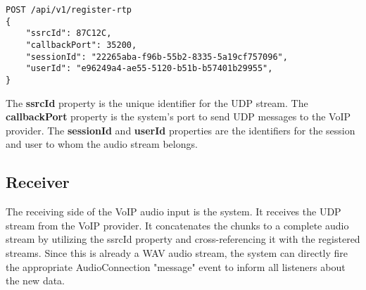 \begin{verbatim}
POST /api/v1/register-rtp
{
    "ssrcId": 87C12C,
    "callbackPort": 35200,
    "sessionId": "22265aba-f96b-55b2-8335-5a19cf757096",
    "userId": "e96249a4-ae55-5120-b51b-b57401b29955",
}
\end{verbatim}

The \textbf{ssrcId} property is the unique identifier for the UDP stream. The \textbf{callbackPort} property is the 
system's port to send UDP messages to the VoIP provider. The \textbf{sessionId} and \textbf{userId} properties are the 
identifiers for the session and user to whom the audio stream belongs.

\subsection{Receiver}

The receiving side of the VoIP audio input is the system. It receives the UDP stream from the VoIP provider. 
It concatenates the chunks to a complete audio stream by utilizing the ssrcId property and cross-referencing it with 
the registered streams. Since this is already a WAV audio stream, the system can directly fire the appropriate 
AudioConnection "message" event to inform all listeners about the new data.
